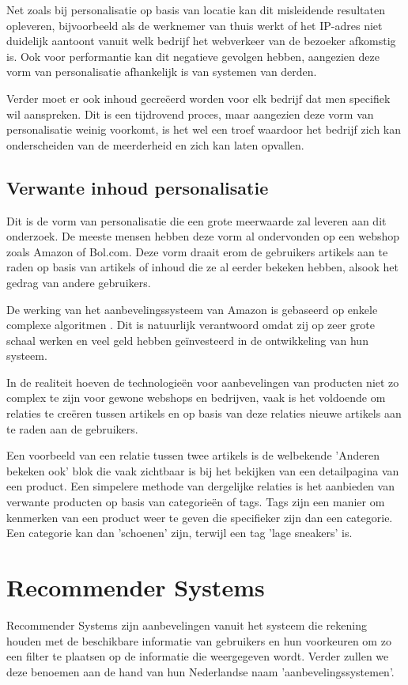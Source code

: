 Net zoals bij personalisatie op basis van locatie kan dit misleidende resultaten opleveren, bijvoorbeeld als de werknemer van thuis werkt of het IP-adres niet duidelijk aantoont vanuit welk bedrijf het webverkeer van de bezoeker afkomstig is. Ook voor performantie kan dit negatieve gevolgen hebben, aangezien deze vorm van personalisatie afhankelijk is van systemen van derden. 

Verder moet er ook inhoud gecreëerd worden voor elk bedrijf dat men specifiek wil aanspreken. Dit is een tijdrovend proces, maar aangezien deze vorm van personalisatie weinig voorkomt, is het wel een troef waardoor het bedrijf zich kan onderscheiden van de meerderheid en zich kan laten opvallen.

  
 \subsection{Verwante inhoud personalisatie}
 \label{subsec:Verwante inhoud personalisatie}
 
 Dit is de vorm van personalisatie die een grote meerwaarde zal leveren aan dit onderzoek. De meeste mensen hebben deze vorm al ondervonden op een webshop zoals Amazon of Bol.com. Deze vorm draait erom de gebruikers artikels aan te raden op basis van artikels of inhoud die ze al eerder bekeken hebben, alsook het gedrag van andere gebruikers.
 
De werking van het aanbevelingssysteem van Amazon is gebaseerd op enkele complexe algoritmen  \autocite{Linden2003}. Dit is natuurlijk verantwoord omdat zij op zeer grote schaal werken en veel geld hebben geïnvesteerd in de ontwikkeling van hun systeem. 

In de realiteit hoeven de technologieën voor aanbevelingen van producten niet zo complex te zijn voor gewone webshops en bedrijven, vaak is het voldoende om relaties te creëren tussen artikels en op basis van deze relaties nieuwe artikels aan te raden aan de gebruikers. 

Een voorbeeld van een relatie tussen twee artikels is de welbekende 'Anderen bekeken ook' blok die vaak zichtbaar is bij het bekijken van een detailpagina van een product. 
Een simpelere methode van dergelijke relaties is het aanbieden van verwante producten op basis van categorieën of tags. Tags zijn een manier om kenmerken van een product weer te geven die specifieker zijn dan een categorie. Een categorie kan dan 'schoenen' zijn, terwijl een tag 'lage sneakers' is. 

\section{Recommender Systems}
\label{sec:Recommender Systems}
Recommender Systems \autocite{Resnick1997} zijn aanbevelingen vanuit het systeem die rekening houden met de beschikbare informatie van gebruikers en hun voorkeuren om zo een filter te plaatsen op de informatie die weergegeven wordt. Verder zullen we deze benoemen aan de hand  van hun Nederlandse naam 'aanbevelingssystemen'.

